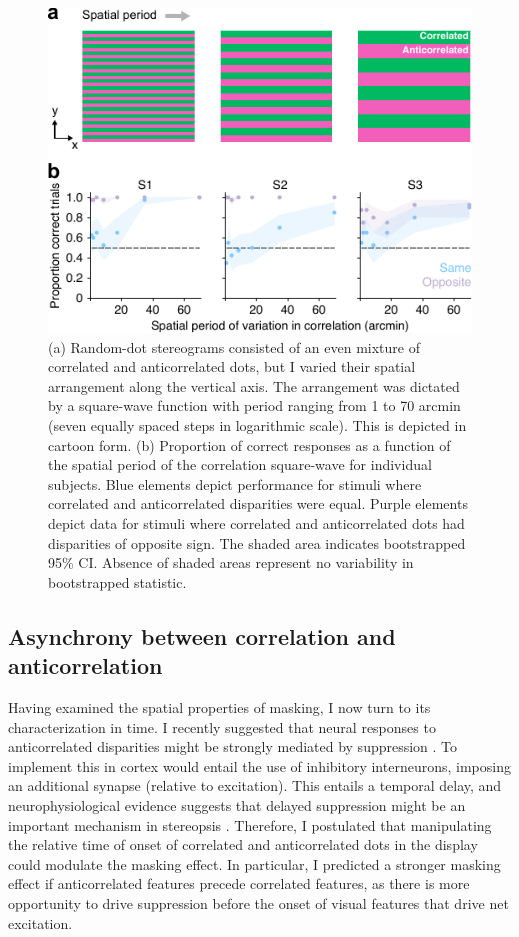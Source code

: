 \begin{figure}
  \centering
  \includegraphics{Fig5}
  \caption[Effect of visuotopic distance between correlated and anticorrelated dots.]{(a) Random-dot stereograms consisted of an even mixture of correlated and anticorrelated dots, but I varied their spatial arrangement along the vertical axis. The arrangement was dictated by a square-wave function with period ranging from 1 to 70 arcmin (seven equally spaced steps in logarithmic scale). This is depicted in cartoon form. (b) Proportion of correct responses as a function of the spatial period of the correlation square-wave for individual subjects. Blue elements depict performance for stimuli where correlated and anticorrelated disparities were equal. Purple elements depict data for stimuli where correlated and anticorrelated dots had disparities of opposite sign. The shaded area indicates bootstrapped 95\% CI. Absence of shaded areas represent no variability in bootstrapped statistic.}
  \label{fig:c2f5}
\end{figure}


\subsection{Asynchrony between correlation and anticorrelation}
Having examined the spatial properties of masking, I now turn to its characterization in time. I recently suggested that neural responses to anticorrelated disparities might be strongly mediated by suppression \cite{Goncalves:2017aa}. To implement this in cortex would entail the use of inhibitory interneurons, imposing an additional synapse (relative to excitation). This entails a temporal delay, and neurophysiological evidence suggests that delayed suppression might be an important mechanism in stereopsis \cite{Tanabe:2011pt,Tanabe:2014ud}. Therefore, I postulated that manipulating the relative time of onset of correlated and anticorrelated dots in the display could modulate the masking effect. In particular, I predicted a stronger masking effect if anticorrelated features precede correlated features, as there is more opportunity to drive suppression before the onset of visual features that drive net excitation.

